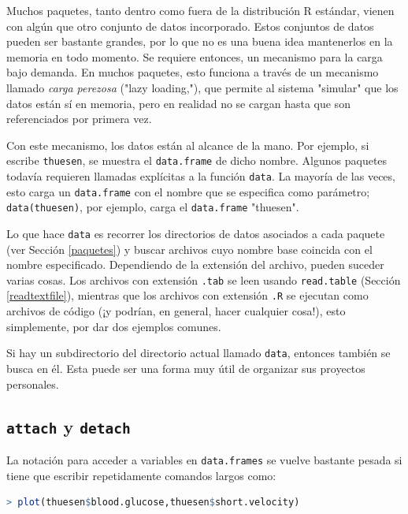 Muchos paquetes, tanto dentro como fuera de la distribución R estándar, vienen
con algún que otro conjunto de datos incorporado. Estos conjuntos de datos
pueden ser bastante grandes, por lo que no es una buena idea mantenerlos en la
memoria en todo momento. Se requiere entonces, un mecanismo para la carga bajo
demanda. En muchos paquetes, esto funciona a través de un mecanismo llamado
\textit{carga perezosa} ("lazy loading,"), que permite al sistema "simular" que
los datos están sí  en memoria, pero en realidad no se cargan hasta que son
referenciados por primera vez.  

Con este mecanismo, los datos están al alcance de la mano. Por ejemplo, si
escribe \texttt{thuesen}, se muestra el \texttt{data.frame} de dicho nombre.
Algunos paquetes todavía requieren llamadas explícitas a la función
\texttt{data}.  La mayoría de las veces, esto carga un \texttt{data.frame} con
el nombre que se especifica como parámetro; \texttt{data(thuesen)}, por
ejemplo, carga el \texttt{data.frame} "thuesen".

Lo que hace \texttt{data} es recorrer los directorios de datos asociados a cada
paquete (ver Sección \ref{paquetes}) y buscar archivos cuyo nombre base
coincida con el nombre especificado. Dependiendo de la extensión del archivo,
pueden suceder varias cosas. Los archivos con extensión \texttt{.tab} se leen
usando \texttt{read.table} (Sección \ref{readtextfile}), mientras que los
archivos con extensión \texttt{.R} se ejecutan como archivos de código (¡y
podrían, en general, hacer cualquier cosa!), esto simplemente, por dar dos
ejemplos comunes.

Si hay un subdirectorio del directorio actual llamado \texttt{data}, entonces
también se busca en él. Esta puede ser una forma muy útil de organizar sus
proyectos personales.

\subsection{\texttt{attach} y \texttt{detach}}\label{attachdetach}

La notación para acceder a variables en \texttt{data.frames} se vuelve bastante pesada
si tiene que escribir repetidamente comandos largos como:

\begin{lstlisting}[language=R]
> plot(thuesen$blood.glucose,thuesen$short.velocity)
\end{lstlisting}

